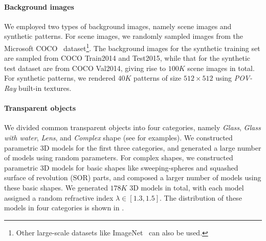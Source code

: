 \paragraph{Background images}
\label{par:Backgrounds Images}
We employed two types of background images, namely scene images and synthetic patterns. For scene images, we randomly sampled images from the Microsoft COCO~\cite{lin2014microsoft} dataset\footnote{Other large-scale datasets like ImageNet~\cite{deng2009imagenet} can also be used.}. The background images for the synthetic training set are sampled from COCO Train2014 and Test2015, while that for the synthetic test dataset are from COCO Val2014, giving rise to $100K$ scene images in total. 
For synthetic patterns, we rendered $40K$ patterns of size $512\times 512$ using \emph{POV-Ray} built-in textures. 

\begin{table} \centering
    \caption[Statistics of our synthetic datasets]{Statistics of our synthetic datasets.}
    \label{tab:synth}
\end{table}

\paragraph{Transparent objects}
\label{par:Transparent Object}
We divided common transparent objects into four categories, namely \emph{Glass}, \emph{Glass with water}, \emph{Lens}, and \emph{Complex} shape (see  for examples). We constructed parametric 3D models for the first three categories, and generated a large number of models using random parameters. For complex shapes, we constructed parametric 3D models for basic shapes like sweeping-spheres and squashed surface of revolution (SOR) parts, and composed a larger number of models using these basic shapes. We generated $178K$ 3D models in total, with each model assigned a random refractive index $\lambda \in [1.3, 1.5]$. The distribution of these models in four categories is shown in . 

